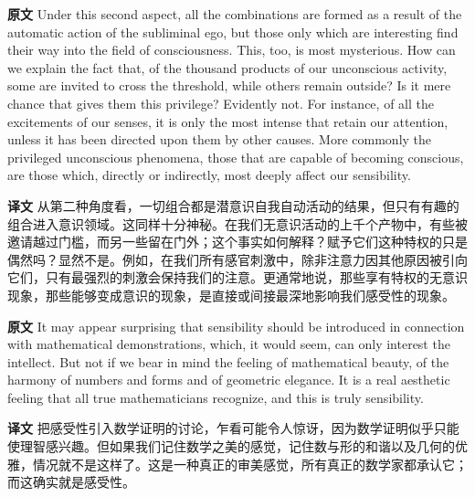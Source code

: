 \documentclass[UTF8,zihao=-4]{ctexart}
\newcommand{\BodyFont}{\fontsize{10.5pt}{15.5pt}\selectfont}
\newcommand{\origlabel}{\textbf{原文}\quad}
\newcommand{\translabel}{\textbf{译文}\quad}
\newenvironment{enblock}{\par\noindent\begingroup\BodyFont\origlabel}{\par\endgroup}
\newenvironment{zhblock}{\par\noindent\begingroup\BodyFont\translabel}{\par\endgroup\vspace{0.35em}}
\begin{document}
\begin{enblock}
Under this second aspect, all the combinations are formed as a result of the automatic action of the subliminal ego, but those only which are interesting find their way into the field of consciousness. This, too, is most mysterious. How can we explain the fact that, of the thousand products of our unconscious activity, some are invited to cross the threshold, while others remain outside? Is it mere chance that gives them this privilege? Evidently not. For instance, of all the excitements of our senses, it is only the most intense that retain our attention, unless it has been directed upon them by other causes. More commonly the privileged unconscious phenomena, those that are capable of becoming conscious, are those which, directly or indirectly, most deeply affect our sensibility.
\end{enblock}
\begin{zhblock}
从第二种角度看，一切组合都是潜意识自我自动活动的结果，但只有有趣的组合进入意识领域。这同样十分神秘。在我们无意识活动的上千个产物中，有些被邀请越过门槛，而另一些留在门外；这个事实如何解释？赋予它们这种特权的只是偶然吗？显然不是。例如，在我们所有感官刺激中，除非注意力因其他原因被引向它们，只有最强烈的刺激会保持我们的注意。更通常地说，那些享有特权的无意识现象，那些能够变成意识的现象，是直接或间接最深地影响我们感受性的现象。\end{zhblock}

\begin{enblock}
It may appear surprising that sensibility should be introduced in connection with mathematical demonstrations, which, it would seem, can only interest the intellect. But not if we bear in mind the feeling of mathematical beauty, of the harmony of numbers and forms and of geometric elegance. It is a real aesthetic feeling that all true mathematicians recognize, and this is truly sensibility.
\end{enblock}
\begin{zhblock}
把感受性引入数学证明的讨论，乍看可能令人惊讶，因为数学证明似乎只能使理智感兴趣。但如果我们记住数学之美的感觉，记住数与形的和谐以及几何的优雅，情况就不是这样了。这是一种真正的审美感觉，所有真正的数学家都承认它；而这确实就是感受性。\end{zhblock}
\end{document}
